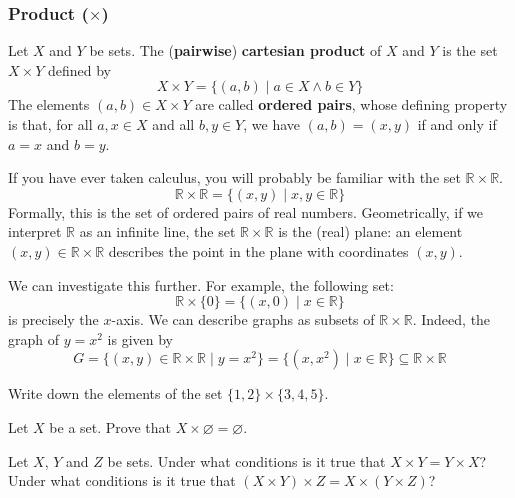 \subsubsection*{Product ($\times$)}

\begin{definition}
\label{defCartesianProductPairwise}
Let $X$ and $Y$ be sets. The (\textbf{pairwise}) \textbf{cartesian product} of $X$ and $Y$ is the set $X \times Y$  defined by
\[ X \times Y = \{ (a,b) \mid a \in X \wedge b \in Y \} \]
The elements $(a,b) \in X \times Y$ are called \textbf{ordered pairs}, whose defining property is that, for all $a,x \in X$ and all $b,y \in Y$, we have $(a,b) = (x,y)$ if and only if $a=x$ and $b=y$.
\end{definition}

\begin{example}
If you have ever taken calculus, you will probably be familiar with the set $\mathbb{R} \times \mathbb{R}$.
\[ \mathbb{R} \times \mathbb{R} = \{ (x,y) \mid x,y \in \mathbb{R} \} \]
Formally, this is the set of ordered pairs of real numbers. Geometrically, if we interpret $\mathbb{R}$ as an infinite line, the set $\mathbb{R} \times \mathbb{R}$ is the (real) plane: an element $(x,y) \in \mathbb{R} \times \mathbb{R}$ describes the point in the plane with coordinates $(x,y)$.

We can investigate this further. For example, the following set:
\[ \mathbb{R} \times \{ 0 \} = \{ (x,0) \mid x \in \mathbb{R} \} \]
is precisely the $x$-axis. We can describe graphs as subsets of $\mathbb{R} \times \mathbb{R}$. Indeed, the graph of $y=x^2$ is given by
\[ G = \{ (x,y) \in \mathbb{R} \times \mathbb{R} \mid y = x^2 \} = \{ (x,x^2) \mid x \in \mathbb{R} \} \subseteq \mathbb{R} \times \mathbb{R} \]
\end{example}

\begin{exercise}
Write down the elements of the set $\{ 1, 2 \} \times \{ 3, 4, 5 \}$.
\end{exercise}

\begin{exercise}
Let $X$ be a set. Prove that $X \times \varnothing = \varnothing$.
\end{exercise}

\begin{exercise}
\label{exCartesianProductNotAssociative}
Let $X$, $Y$ and $Z$ be sets. Under what conditions is it true that $X \times Y = Y \times X$? Under what conditions is it true that $(X \times Y) \times Z = X \times (Y \times Z)$?
\end{exercise}

